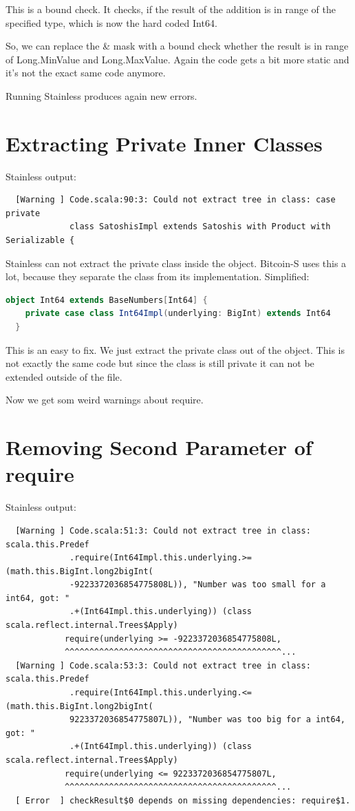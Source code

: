 This is a bound check.
It checks, if the result of the addition is in range of the specified type, which is now the hard coded Int64.

So, we can replace the \& mask with a bound check whether the result is in range of Long.MinValue and Long.MaxValue.
Again the code gets a bit more static and it's not the exact same code anymore.

Running Stainless produces again new errors.


\section{Extracting Private Inner Classes}

Stainless output:
{\footnotesize\begin{verbatim}
  [Warning ] Code.scala:90:3: Could not extract tree in class: case private
             class SatoshisImpl extends Satoshis with Product with Serializable {
\end{verbatim}}

Stainless can not extract the private class inside the object.
Bitcoin-S uses this a lot, because they separate the class from its implementation.
Simplified:
\begin{lstlisting}[language=scala]
  object Int64 extends BaseNumbers[Int64] {
    private case class Int64Impl(underlying: BigInt) extends Int64 
  }
\end{lstlisting}

This is an easy to fix.
We just extract the private class out of the object.
This is not exactly the same code but since the class is still private it can not be extended outside of the file.

Now we get som weird warnings about require.


\section{Removing Second Parameter of require}

Stainless output:
{\footnotesize\begin{verbatim}
  [Warning ] Code.scala:51:3: Could not extract tree in class: scala.this.Predef
             .require(Int64Impl.this.underlying.>=(math.this.BigInt.long2bigInt(
             -9223372036854775808L)), "Number was too small for a int64, got: "
             .+(Int64Impl.this.underlying)) (class scala.reflect.internal.Trees$Apply)
            require(underlying >= -9223372036854775808L,
            ^^^^^^^^^^^^^^^^^^^^^^^^^^^^^^^^^^^^^^^^^^^^...
  [Warning ] Code.scala:53:3: Could not extract tree in class: scala.this.Predef
             .require(Int64Impl.this.underlying.<=(math.this.BigInt.long2bigInt(
             9223372036854775807L)), "Number was too big for a int64, got: "
             .+(Int64Impl.this.underlying)) (class scala.reflect.internal.Trees$Apply)
            require(underlying <= 9223372036854775807L,
            ^^^^^^^^^^^^^^^^^^^^^^^^^^^^^^^^^^^^^^^^^^^...
  [ Error  ] checkResult$0 depends on missing dependencies: require$1.
\end{verbatim}}

